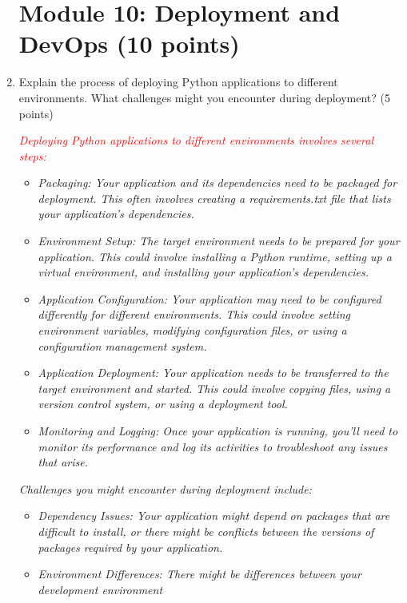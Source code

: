 \documentclass{article}
\begin{document}
\begin{enumerate}
          \section{Module 10: Deployment and DevOps (10 points)}
          \item Explain the process of deploying Python applications to different environments.
          What challenges might you encounter during deployment? (5
          points)\par
          \textcolor{red}{\textit{Deploying Python applications to different environments involves several steps:}}
          \begin{itemize}
            \color{red}
            \item \textit{Packaging: Your application and its dependencies need to be packaged for deployment.
             This often involves creating a requirements.txt file that lists your application's dependencies.}
             \item \textit{Environment Setup: The target environment needs to be prepared for your application. 
             This could involve installing a Python runtime, setting up a virtual environment, and installing your application's dependencies.}
             \item \textit{Application Configuration: Your application may need to be configured differently for different environments. 
             This could involve setting environment variables, modifying configuration files, or using a configuration management system.}
             \item \textit{Application Deployment: Your application needs to be transferred to the target environment and started. 
             This could involve copying files, using a version control system, or using a deployment tool.}
             \item \textit{Monitoring and Logging: Once your application is running, you'll need to monitor its 
             performance and log its activities to troubleshoot any issues that arise.}
          \end{itemize}
          \textit{Challenges you might encounter during deployment include:}
          \begin{itemize}
            \color{red}
            \item \textit{Dependency Issues: Your application might depend on packages that are difficult to install, 
            or there might be conflicts between the versions of packages required by your application.}
            \item \textit{Environment Differences: There might be differences between your development environment 
}
\end{itemize}
\end{enumerate}
\end{document}
